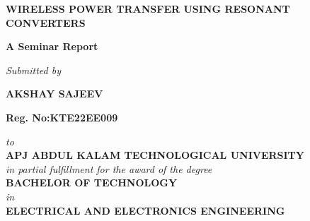 \documentclass[12pt,a4paper]{report}
\begin{document}
\begin{center}

\thispagestyle{empty}

\MakeUppercase{\Large \textbf{Wireless Power Transfer Using Resonant Converters}}\\

\vspace{0.8cm}

\large\textbf{A Seminar Report}\\

\vspace{0.3cm}

\textit{Submitted by} \\

\vspace{0.4cm}

{\textbf{AKSHAY SAJEEV}}\\

\vspace{0.2cm}

{\textbf{Reg. No:KTE22EE009}}\\

\vspace{0.2cm}

\textit{to}\\

\textbf{APJ ABDUL KALAM TECHNOLOGICAL UNIVERSITY }\\

\textit{in partial fulfillment for the award of the degree }\\

\textbf{BACHELOR OF TECHNOLOGY}  \\

\textit{in}\\

\textbf{ELECTRICAL AND ELECTRONICS ENGINEERING}

\end{center}



 
\end{document}
